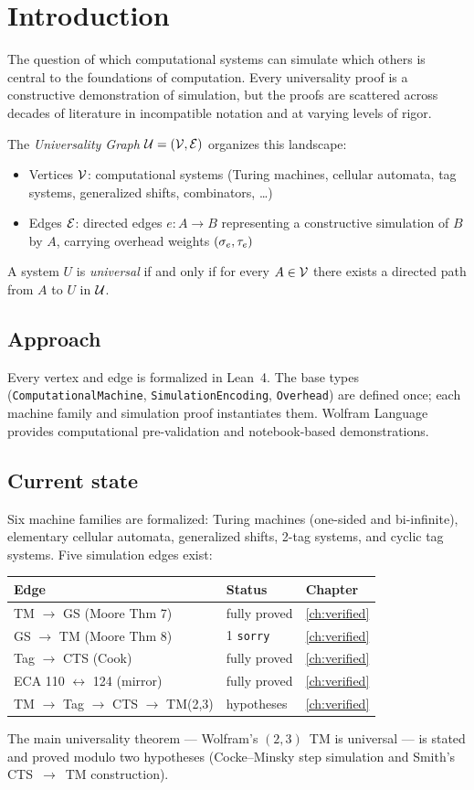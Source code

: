 \chapter{Introduction}\label{ch:intro}

The question of which computational systems can simulate which others is central to
the foundations of computation. Every universality proof is a constructive
demonstration of simulation, but the proofs are scattered across decades of literature
in incompatible notation and at varying levels of rigor.

The \emph{Universality Graph} $\mathcal{U} = (\mathcal{V}, \mathcal{E})$ organizes this landscape:
\begin{itemize}
\item Vertices $\mathcal{V}$: computational systems (Turing machines, cellular automata, tag
  systems, generalized shifts, combinators, \ldots)
\item Edges $\mathcal{E}$: directed edges $e : A \to B$ representing a constructive simulation
  of $B$ by $A$, carrying overhead weights $(\sigma_e, \tau_e)$
\end{itemize}
A system $U$ is \emph{universal} if and only if for every $A \in \mathcal{V}$ there exists a
directed path from $A$ to $U$ in $\mathcal{U}$.

\section{Approach}

Every vertex and edge is formalized in Lean~4. The base types
(\texttt{ComputationalMachine}, \texttt{SimulationEncoding}, \texttt{Overhead})
are defined once; each machine family and simulation proof instantiates them.
Wolfram Language provides computational pre-validation and notebook-based
demonstrations.

\section{Current state}

Six machine families are formalized: Turing machines (one-sided and bi-infinite),
elementary cellular automata, generalized shifts, 2-tag systems, and cyclic tag
systems. Five simulation edges exist:

\begin{center}
\begin{tabular}{lll}
\toprule
Edge & Status & Chapter \\
\midrule
TM $\to$ GS (Moore Thm 7) & fully proved & \ref{ch:verified} \\
GS $\to$ TM (Moore Thm 8) & 1 \texttt{sorry} & \ref{ch:verified} \\
Tag $\to$ CTS (Cook) & fully proved & \ref{ch:verified} \\
ECA 110 $\leftrightarrow$ 124 (mirror) & fully proved & \ref{ch:verified} \\
TM $\to$ Tag $\to$ CTS $\to$ TM(2,3) & hypotheses & \ref{ch:verified} \\
\bottomrule
\end{tabular}
\end{center}

The main universality theorem --- Wolfram's $(2,3)$~TM is universal --- is stated
and proved modulo two hypotheses (Cocke--Minsky step simulation and Smith's
CTS~$\to$~TM construction).

